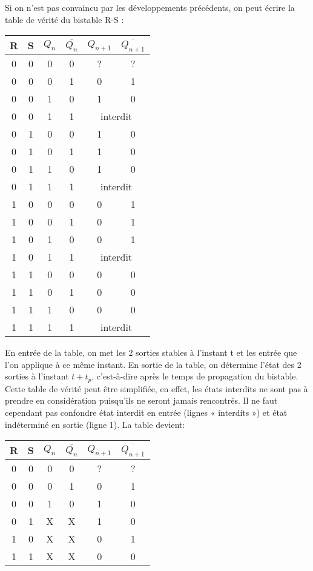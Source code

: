 \documentclass{../template/labo}
\begin{document}
\begin{info}
Si on n'est pas convaincu par les développements précédents, on peut écrire la table de vérité du
bistable R-S :

\begin{center}
\begin{tabular}{cccc|cc}
R & S & $Q_n$ & $\overline{Q_n}$ & $Q_{n+1}$ & $\overline{Q_{n+1}}$ \\
\hline
0 & 0 & 0 & 0 & ? & ? \\
0 & 0 & 0 & 1 & 0 & 1 \\
0 & 0 & 1 & 0 & 1 & 0 \\
0 & 0 & 1 & 1 &  \multicolumn{2}{c}{interdit} \\
0 & 1 & 0 & 0 & 1 & 0 \\
0 & 1 & 0 & 1 & 1 & 0 \\
0 & 1 & 1 & 0 & 1 & 0 \\
0 & 1 & 1 & 1 & \multicolumn{2}{c}{interdit}  \\
1 & 0 & 0 & 0 & 0 & 1 \\
1 & 0 & 0 & 1 & 0 & 1 \\
1 & 0 & 1 & 0 & 0 & 1 \\
1 & 0 & 1 & 1 & \multicolumn{2}{c}{interdit}  \\
1 & 1 & 0 & 0 & 0 & 0 \\
1 & 1 & 0 & 1 & 0 & 0 \\
1 & 1 & 1 & 0 & 0 & 0 \\
1 & 1 & 1 & 1 & \multicolumn{2}{c}{interdit}  \\
\end{tabular}
\end{center}

En entrée de la table, on met les 2 sorties stables à l'instant t et les entrée que l'on applique à ce
même instant. En sortie de la table, on détermine l'état des 2 sorties à l'instant $t+t_p$, c'est-à-dire après le
temps de propagation du bistable.
Cette table de vérité peut être simplifiée, en effet, les états interdits ne sont pas à prendre en
considération puisqu'ils ne seront jamais rencontrés. Il ne faut cependant pas confondre état
interdit en entrée (lignes « interdits ») et état indéterminé en sortie (ligne 1). La table devient:


\begin{center}
\begin{tabular}{cccc|cc}
R & S & $Q_n$ & $\overline{Q_n}$ & $Q_{n+1}$ & $\overline{Q_{n+1}}$ \\
\hline
0 & 0 & 0 & 0 & ? & ? \\
0 & 0 & 0 & 1 & 0 & 1 \\
0 & 0 & 1 & 0 & 1 & 0 \\
0 & 1 & X & X & 1 & 0 \\
1 & 0 & X & X & 0 & 1 \\
1 & 1 & X & X & 0 & 0 \\
\end{tabular}
\end{center}


\end{info}
\end{document}
